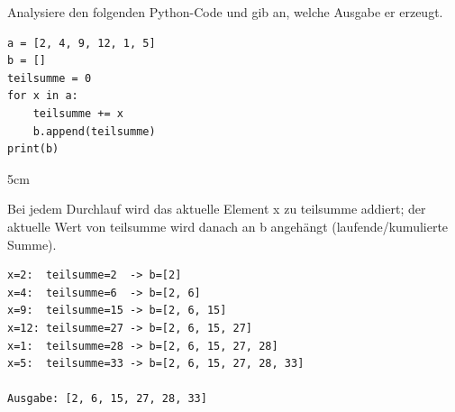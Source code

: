 \question[4]
Analysiere den folgenden Python-Code und gib an, welche Ausgabe er erzeugt.
\begin{lstlisting}
a = [2, 4, 9, 12, 1, 5]
b = []
teilsumme = 0
for x in a:
    teilsumme += x
    b.append(teilsumme)
print(b)
\end{lstlisting}

\begin{solutionbox}{5cm}

Bei jedem Durchlauf wird das aktuelle Element x zu teilsumme
addiert; der aktuelle Wert von teilsumme wird danach an b
angehängt (laufende/kumulierte Summe).

\begin{lstlisting}
x=2:  teilsumme=2  -> b=[2]
x=4:  teilsumme=6  -> b=[2, 6]
x=9:  teilsumme=15 -> b=[2, 6, 15]
x=12: teilsumme=27 -> b=[2, 6, 15, 27]
x=1:  teilsumme=28 -> b=[2, 6, 15, 27, 28]
x=5:  teilsumme=33 -> b=[2, 6, 15, 27, 28, 33]

Ausgabe: [2, 6, 15, 27, 28, 33]
\end{lstlisting}
\end{solutionbox}